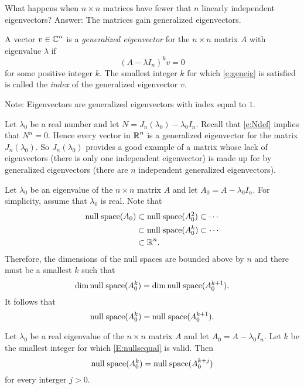 \documentclass{ximera}
\begin{document}
What happens when $n\times n$ matrices have fewer that $n$ linearly 
independent eigenvectors?  Answer: The matrices gain generalized 
eigenvectors.

\begin{definition}
A vector $v\in\mbox{$\Bbb{C}$}^n$ is a {\em generalized eigenvector\/} for the 
$n\times n$ matrix $A$ with eigenvalue $\lambda$ if
\begin{equation}  \label{e:geneig}
(A-\lambda I_n)^kv = 0
\end{equation}
for some positive integer $k$. The smallest integer $k$ for which
\eqref{e:geneig} is satisfied is called the {\em index\/}
 of the generalized eigenvector $v$.
\end{definition}  
Note: Eigenvectors are generalized eigenvectors with
index equal to $1$.

Let $\lambda_0$ be a real number and let $N=J_n(\lambda_0)-\lambda_0 I_n$.  
Recall that \eqref{e:Ndef} implies that $N^n=0$.  Hence every vector in $\mbox{$\Bbb{R}$}^n$ 
is a generalized eigenvector for the matrix $J_n(\lambda_0)$.  So 
$J_n(\lambda_0)$ provides a good example of a matrix whose lack of 
eigenvectors (there is only one independent eigenvector) is made up for by 
generalized eigenvectors (there are $n$ independent generalized eigenvectors).

Let $\lambda_0$ be an eigenvalue of the $n\times n$ matrix $A$ and let 
$A_0 = A-\lambda_0 I_n$.  For simplicity, assume that $\lambda_0$ is real.
Note that 
\begin{align*}
  {\rm null\;space}(A_0) &\subset {\rm null\;space}(A_0^2)\subset\cdots \\
  &\subset{\rm null\;space}(A_0^k)\subset\cdots \\
  &\subset\mbox{$\Bbb{R}$}^n.
\end{align*}
Therefore, the dimensions of the null spaces are bounded above by $n$ and
there must be a smallest $k$ such that 
\[
\dim{\rm null\;space}(A_0^k)=\dim{\rm null\;space}(A_0^{k+1}).
\]
It follows that 
\begin{equation}  \label{E:nullsequal}
{\rm null\;space}(A_0^k)={\rm null\;space}(A_0^{k+1}).
\end{equation}
\begin{lemma}  \label{L:Jordan}
Let $\lambda_0$ be a real eigenvalue of the $n\times n$ matrix $A$ and let 
$A_0 = A-\lambda_0 I_n$.  Let $k$ be the smallest integer for which 
\eqref{E:nullsequal} is valid.  Then 
\[
{\rm null\;space}(A_0^k)={\rm null\;space}(A_0^{k+j})
\]
for every interger $j>0$.
\end{lemma}
\end{document}
